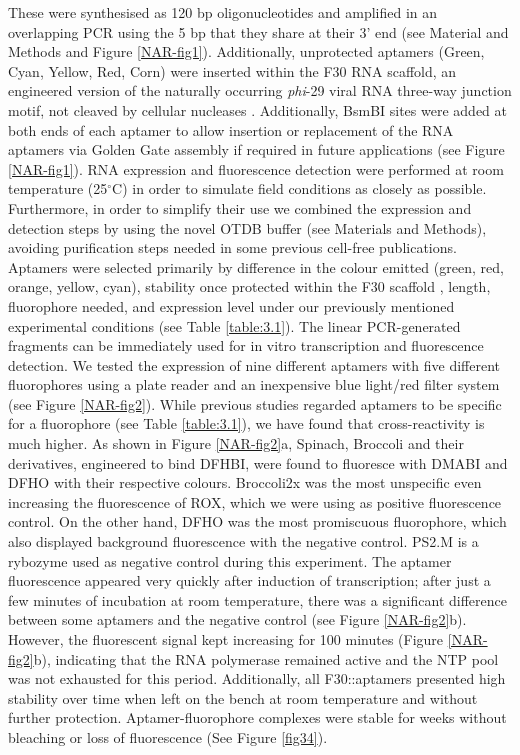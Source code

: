  These were synthesised as 120 bp oligonucleotides and amplified in an overlapping PCR using the 5 bp that they share at their 3’ end (see Material and Methods and Figure \ref{NAR-fig1}). Additionally, unprotected aptamers (Green, Cyan, Yellow, Red, Corn) were inserted within the F30 RNA scaffold, an engineered version of the naturally occurring \textit{phi}-29 viral RNA three-way junction motif, not cleaved by cellular nucleases \citep{filonov2014broccoli}. Additionally, BsmBI sites were added at both ends of each aptamer to allow insertion or replacement of the RNA aptamers via Golden Gate assembly if required in future applications (see Figure \ref{NAR-fig1}). RNA expression and fluorescence detection were performed at room temperature (25$^{\circ}$C) in order to simulate field conditions as closely as possible. Furthermore, in order to simplify their use we combined the expression and detection steps by using the novel OTDB buffer (see Materials and Methods), avoiding purification steps needed in some previous cell-free publications. Aptamers were selected primarily by difference in the colour emitted (green, red, orange, yellow, cyan), stability once protected within the F30 scaffold \citep{filonov2014broccoli}, length, fluorophore needed, and expression level under our previously mentioned experimental conditions (see Table \ref{table:3.1}).
The linear PCR-generated fragments can be immediately used for in vitro transcription and fluorescence detection. We tested the expression of nine different aptamers with five different fluorophores using a plate reader and an inexpensive blue light/red filter system (see Figure \ref{NAR-fig2}). While previous studies regarded aptamers to be specific for a fluorophore (see Table \ref{table:3.1}), we have found that cross-reactivity is much higher. As shown in Figure \ref{NAR-fig2}a, Spinach, Broccoli and their derivatives, engineered to bind DFHBI, were found to fluoresce with DMABI and DFHO with their respective colours. Broccoli2x was the most unspecific even increasing the fluorescence of ROX, which we were using as positive fluorescence control. On the other hand, DFHO was the most promiscuous fluorophore, which also displayed background fluorescence with the negative control. PS2.M is a rybozyme used as negative control during this experiment. The aptamer fluorescence appeared very quickly after induction of transcription; after just a few minutes of incubation at room temperature, there was a significant difference between some aptamers and the negative control (see Figure \ref{NAR-fig2}b). However, the fluorescent signal kept increasing for 100 minutes (Figure \ref{NAR-fig2}b), indicating that the RNA polymerase remained active and the NTP pool was not exhausted for this period. Additionally, all F30::aptamers presented high stability over time when left on the bench at room temperature and without further protection. Aptamer-fluorophore complexes were stable for weeks without bleaching or loss of fluorescence (See Figure \ref{fig34}).


